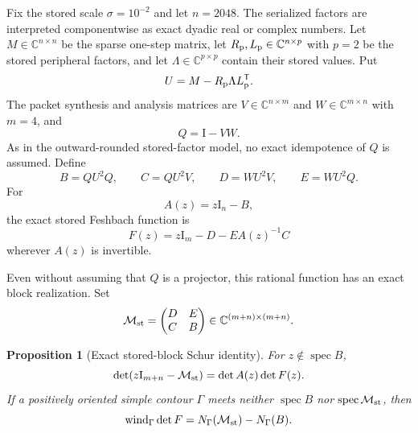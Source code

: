 \documentclass[11pt]{article}
\newtheorem{proposition}[theorem]{Proposition}
\theoremstyle{definition}
\theoremstyle{remark}
\newcommand{\C}{\mathbb C}
\newcommand{\Id}{\mathrm I}
\newcommand{\wind}{\operatorname{wind}}
\newcommand{\spec}{\operatorname{spec}}
\newcommand{\Maug}{\mathcal M_{\rm st}}
\begin{document}
Fix the stored scale $\sigma=10^{-2}$ and let $n=2048$.  The serialized
factors are interpreted componentwise as exact dyadic real or complex
numbers.  Let $M\in\C^{n\times n}$ be the sparse one-step matrix, let
$R_{\rm p},L_{\rm p}\in\C^{n\times p}$ with $p=2$ be the stored peripheral
factors, and let $\Lambda\in\C^{p\times p}$ contain their stored values.  Put
\begin{equation}
 U=M-R_{\rm p}\Lambda L_{\rm p}^{\mathsf T}.
 \label{eq:stored-u}
\end{equation}
The packet synthesis and analysis matrices are
$V\in\C^{n\times m}$ and $W\in\C^{m\times n}$ with $m=4$, and
\begin{equation}
 Q=\Id-VW.
 \label{eq:stored-q}
\end{equation}
As in the outward-rounded stored-factor model, no exact idempotence of $Q$
is assumed.  Define
\begin{equation}
 B=QU^2Q,\qquad C=QU^2V,\qquad D=WU^2V,\qquad E=WU^2Q.
 \label{eq:stored-blocks}
\end{equation}
For
\begin{equation}
 A(z)=z\Id_n-B,
 \label{eq:complement-shift}
\end{equation}
the exact stored Feshbach function is
\begin{equation}
 F(z)=z\Id_m-D-EA(z)^{-1}C
 \label{eq:stored-feshbach}
\end{equation}
wherever $A(z)$ is invertible.

Even without assuming that $Q$ is a projector, this rational function has
an exact block realization.  Set
\begin{equation}
 \Maug=
 \begin{pmatrix}
  D&E\\ C&B
 \end{pmatrix}
 \in\C^{(m+n)\times(m+n)}.
 \label{eq:stored-augmented-block}
\end{equation}

\begin{proposition}[Exact stored-block Schur identity]
\label{prop:stored-schur}
For $z\notin\spec B$,
\begin{equation}
 \det(z\Id_{m+n}-\Maug)=\det A(z)\det F(z).
 \label{eq:stored-schur-determinant}
\end{equation}
If a positively oriented simple contour $\Gamma$ meets neither
$\spec B$ nor $\spec\Maug$, then
\begin{equation}
 \wind_\Gamma\det F=N_\Gamma(\Maug)-N_\Gamma(B).
 \label{eq:stored-relative-count}
\end{equation}
\end{proposition}
\end{document}
